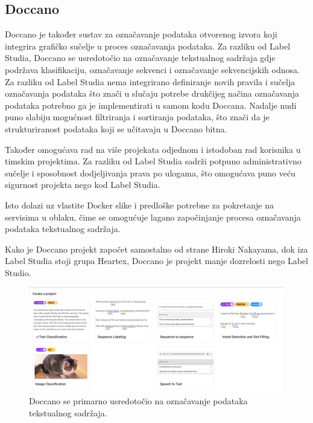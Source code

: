 \documentclass[times, utf8, zavrsni, numeric]{fer}
\begin{document}
\subsection{Doccano}

Doccano je također sustav za označavanje podataka otvorenog izvora koji integrira grafičko sučelje u proces označavanja podataka.
Za razliku od Label Studia, Doccano se usredotočio na označavanje tekstualnog sadržaja gdje podržava klasifikaciju, označavanje sekvenci i označavanje sekvencijskih odnosa.
Za razliku od Label Studia nema integrirano definiranje novih pravila i sučelja označavanja podataka što znači u slučaju potrebe drukčijeg načina označavanja podataka potrebno ga je implementirati u samom kodu Doccana.
Nadalje nudi puno slabiju mogućnost filtriranja i sortiranja podataka, što znači da je strukturiranost podataka koji se učitavaju u Doccano bitna.

Također omogućava rad na više projekata odjednom i istodoban rad korisnika u timskim projektima.
Za razliku od Label Studia sadrži potpuno administrativno sučelje i sposobnost dodjeljivanja prava po ulogama, što omogućava puno veću sigurnost projekta nego kod Label Studia. 

Isto dolazi uz vlastite Docker slike i predloške potrebne za pokretanje na servisima u oblaku, čime se omogućuje lagano započinjanje procesa označavanja podataka tekstualnog sadržaja. \citep{doccano_docs} \citep{doccano_github}

Kako je Doccano projekt započet samostalno od strane Hiroki Nakayama, dok iza Label Studia stoji grupa Heartex, Doccano je projekt manje dozrelosti nego Label Studio.

\begin{figure}[H]
\centering
\includegraphics[width=\textwidth]{pictures/doccano_types.png}
\caption{Doccano se primarno usredotočio na označavanje podataka tekstualnog sadržaja.}
\label{doccano_types}
\end{figure}
\end{document}
